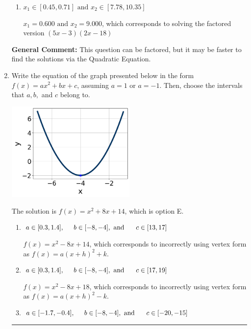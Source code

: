 \documentclass{extbook}[14pt]
\newcommand{\litem}[1]{\item #1

\rule{\textwidth}{0.4pt}}
\begin{document}
\begin{enumerate}
{\begin{enumerate}[label=\Alph*.]
$x_1 = 1.500 \text{ and } x_2 = 3.600$, which corresponds to solving the factored version $(2x -3)(5x -18)$
\item \( x_1 \in [0.45, 0.71] \text{ and } x_2 \in [7.78, 10.35] \)

$x_1 = 0.600 \text{ and } x_2 = 9.000$, which corresponds to solving the factored version $(5x -3)(2x -18)$
\end{enumerate}

\textbf{General Comment:} This question can be factored, but it may be faster to find the solutions via the Quadratic Equation.
}
\litem{
Write the equation of the graph presented below in the form $f(x)=ax^2+bx+c$, assuming  $a=1$ or $a=-1$. Then, choose the intervals that $a, b,$ and $c$ belong to.

\begin{center}
    \includegraphics[width=0.5\textwidth]{../Figures/quadraticGraphToEquationC.png}
\end{center}


The solution is \( f(x) = x^{2} +8 x + 14 \), which is option E.\begin{enumerate}[label=\Alph*.]
\item \( a \in [0.3, 1.4], \hspace*{5mm} b \in [-8, -4], \text{ and } \hspace*{5mm} c \in [13, 17] \)

$f(x)=x^{2} -8 x + 14$, which corresponds to incorrectly using vertex form as $f(x) = a(x+h)^2+k$.
\item \( a \in [0.3, 1.4], \hspace*{5mm} b \in [-8, -4], \text{ and } \hspace*{5mm} c \in [17, 19] \)

$f(x)=x^{2} -8 x + 18$, which corresponds to incorrectly using vertex form as $f(x) = a(x+h)^2 - k$.
\item \( a \in [-1.7, -0.4], \hspace*{5mm} b \in [-8, -4], \text{ and } \hspace*{5mm} c \in [-20, -15] \)


\end{enumerate}}
\end{enumerate}
\end{document}
